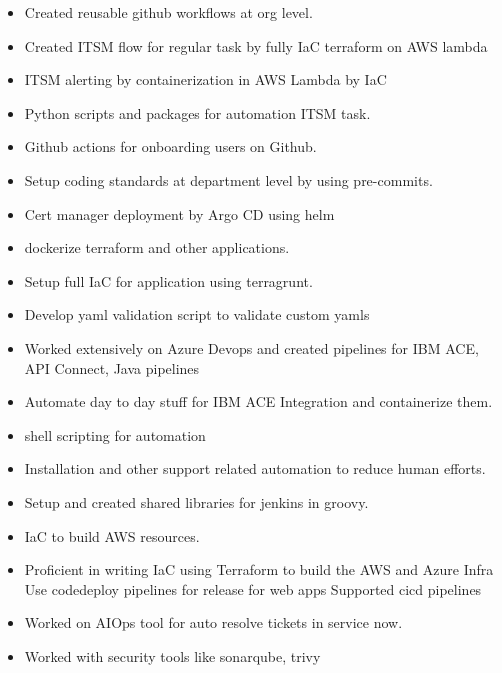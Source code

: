 \documentclass[10pt,a4paper,ragged2e,withhyper]{altacv}
\begin{document}
\begin{paracol}{2}

\begin{itemize}
\item Created reusable github workflows at org level.
\item Created ITSM flow for regular task by fully IaC terraform on AWS lambda
\item ITSM alerting by containerization in AWS Lambda by IaC
\item Python scripts and packages for automation ITSM task.
\item Github actions for onboarding users on Github.
\item Setup coding standards at department level by using pre-commits.
\item Cert manager deployment by Argo CD using helm
\item dockerize terraform and other applications.
\item Setup full IaC for application using terragrunt.
\item Develop yaml validation script to validate custom yamls
\end{itemize}

\divider

\begin{itemize}
\item Worked extensively on Azure Devops and created pipelines for IBM ACE, API Connect, Java pipelines
\item Automate day to day stuff for IBM ACE Integration and containerize them.
\item shell scripting for automation
\item Installation and other support related automation to reduce human efforts.
\end{itemize}

\divider

\begin{itemize}
\item Setup and created shared libraries for jenkins in groovy. 
\item IaC to build AWS resources.
\item Proficient in writing IaC using Terraform to build the AWS and Azure Infra Use codedeploy pipelines for release for web apps Supported cicd pipelines
\item Worked on AIOps tool for auto resolve tickets in service now.
\item Worked with security tools like sonarqube, trivy
\end{itemize}


\end{paracol}
\end{document}
